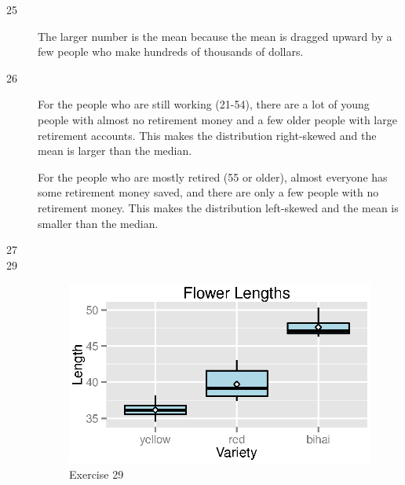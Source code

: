 \documentclass{exam}
\begin{document}
  \ifprintanswers
    \begin{description}
      \item[25] The larger number is the mean because the mean is dragged upward by a few
        people who make hundreds of thousands of dollars.

      \item[26] 
        For the people who are still working (21-54), there are a lot of young people with
        almost no retirement money and a few older people with large retirement accounts.
        This makes the distribution right-skewed and the mean is larger than the median.

        For the people who are mostly retired (55 or older), almost everyone has some
        retirement money saved, and there are only a few people with no retirement money.
        This makes the distribution left-skewed and the mean is smaller than the median.

      \item[27] 

      \item[29]
        \begin{figure}[H]
          \centering
          \includegraphics{figures/ex29.eps}
          \caption{Exercise 29}
        \end{figure}


\end{description}
\end{document}
